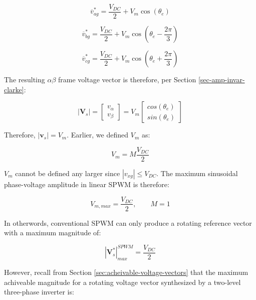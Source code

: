 \documentclass{article}
\begin{document}
\begin{equation}
    \overline{v}_{ag}^* = \frac{V_{DC}}{2} + V_m\cos(\theta_e)
\end{equation}

\begin{equation}
    \overline{v}_{bg}^* = \frac{V_{DC}}{2} + V_m\cos(\theta_e - \frac{2\pi}{3})
\end{equation}

\begin{equation}
    \overline{v}_{cg}^* = \frac{V_{DC}}{2} + V_m\cos(\theta_e + \frac{2\pi}{3})
\end{equation}

The resulting $\alpha\beta$ frame voltage vector is therefore, per Section \ref{sec-amp-invar-clarke}:

\begin{equation}
    |\mathbf{V}_s| =
    \begin{bmatrix}
        v_\alpha \\
        v_\beta
    \end{bmatrix}
    = V_m
    \begin{bmatrix}
        cos(\theta_e) \\
        sin(\theta_e)
    \end{bmatrix}
\end{equation}

Therefore, $|\mathbf{v}_s| = V_m$. Earlier, we defined $V_m$ as:

\begin{equation}
    V_m = M\frac{V_{DC}}{2}
\end{equation}

$V_m$ cannot be defined any larger since $|v_{xg}| \leq V_{DC}$. The maximum sinusoidal phase-voltage amplitude in linear SPWM is therefore:

\begin{equation}
    V_{m,max} = \frac{V_{DC}}{2}, \qquad M = 1
\end{equation}

In otherwords, conventional SPWM can only produce a rotating reference vector with a maximum magnitude of:

\begin{equation}
    |\mathbf{V}_s^*|_{max}^{SPWM} = \frac{V_{DC}}{2}
\end{equation}

However, recall from Section \ref{sec:acheivable-voltage-vectors} that the maximum achiveable magnitude for a rotating voltage vector synthesized by a two-level three-phase inverter is:
\end{document}
